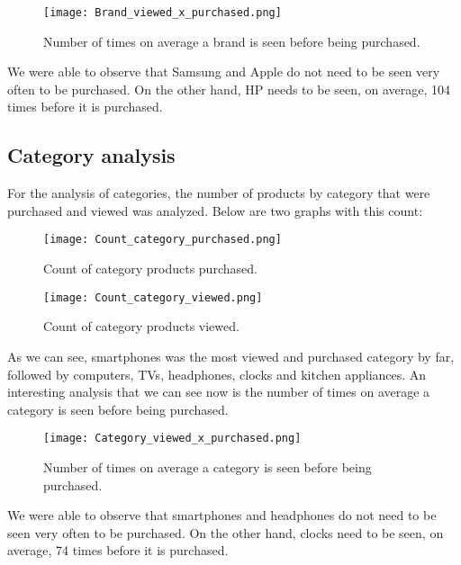 \begin{figure}[H]
    \centering
    \texttt{[image: Brand\_viewed\_x\_purchased.png]}
    \caption{Number of times on average a brand is seen before being purchased.}
\end{figure}

We were able to observe that Samsung and Apple do not need to be seen very often to be purchased.
On the other hand, HP needs to be seen, on average, 104 times before it is purchased.

\subsection{Category analysis}
For the analysis of categories, the number of products by category that were purchased and viewed was analyzed.
Below are two graphs with this count:

\begin{figure}[H]
    \centering
    \texttt{[image: Count\_category\_purchased.png]}
    \caption{Count of category products purchased.}
\end{figure}

\begin{figure}[H]
    \centering
    \texttt{[image: Count\_category\_viewed.png]}
    \caption{Count of category products viewed.}
\end{figure}

As we can see, smartphones was the most viewed and purchased category by far, followed by computers, TVs, headphones, clocks and kitchen appliances.
An interesting analysis that we can see now is the number of times on average a category is seen before being purchased.

\begin{figure}[H]
    \centering
    \texttt{[image: Category\_viewed\_x\_purchased.png]}
    \caption{Number of times on average a category is seen before being purchased.}
\end{figure}

We were able to observe that smartphones and headphones do not need to be seen very often to be purchased.
On the other hand, clocks need to be seen, on average, 74 times before it is purchased.
